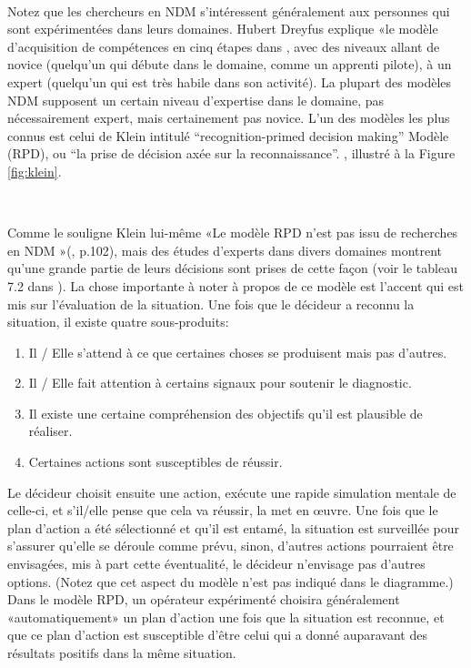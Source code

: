 ~\par
Notez que les chercheurs en NDM s'intéressent généralement aux personnes qui sont expérimentées dans leurs domaines. Hubert Dreyfus explique «le modèle d’acquisition de compétences en cinq étapes dans \parencite{dreyfus2014intuitive}, avec des niveaux allant de novice (quelqu'un qui débute dans  le domaine, comme un apprenti pilote), à un expert (quelqu'un qui est très habile dans son activité). La plupart des modèles NDM supposent un certain niveau d'expertise dans le domaine, pas nécessairement expert, mais certainement pas novice. L’un des modèles les plus connus est celui de Klein intitulé  “recognition-primed decision making” Modèle (RPD),  ou “la prise de décision axée sur la reconnaissance”. \parencite{klein2017sources}, illustré à la Figure \ref{fig:klein}.

~\par 
Comme le souligne Klein lui-même «Le modèle RPD n'est pas issu de recherches en NDM »(\parencite{klein2017sources}, p.102), mais des études d’experts dans divers domaines montrent qu’une grande partie de leurs décisions sont prises de cette façon (voir le tableau 7.2 dans \parencite{klein2017sources}). La chose importante à noter à propos de ce modèle est l'accent qui est mis sur l'évaluation de la situation. Une fois que le décideur a reconnu la situation, il existe quatre sous-produits:

\begin{enumerate}

\item Il / Elle s'attend à ce que certaines choses se produisent mais pas d'autres.
\item Il / Elle fait attention à certains signaux pour soutenir le diagnostic.
\item Il existe une certaine compréhension des objectifs qu'il est plausible de réaliser.
\item Certaines actions sont susceptibles de réussir.
\end{enumerate}

Le décideur choisit ensuite une action, exécute une rapide simulation mentale de
celle-ci, et s'il/elle pense que cela va réussir, la met en œuvre. Une fois que le plan d’action  a été sélectionné et qu’il est entamé, la situation est surveillée pour s’assurer qu’elle se déroule comme prévu, sinon, d’autres actions pourraient être envisagées, mis à part cette éventualité, le décideur n'envisage pas d'autres options. (Notez que cet aspect du modèle n’est pas indiqué dans le diagramme.) Dans le modèle RPD, un opérateur expérimenté
choisira généralement «automatiquement» un plan d’action une fois que la situation est
reconnue, et que ce plan d’action est susceptible d’être celui qui a donné  auparavant
des résultats positifs dans la même situation.


